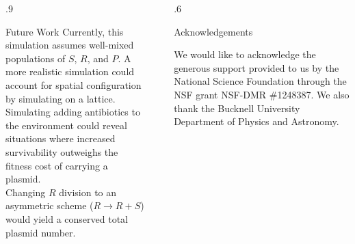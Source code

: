 \documentclass[final]{beamer}
\newlength{\sepwid}
\newlength{\onecolwid}
\begin{document}
\begin{frame}[t]
\begin{block}
\begin{columns}[t]
\begin{column}{.9\onecolwid}
  \begin{alertblock}{Future Work}
    Currently, this simulation assumes well-mixed populations of $S$, $R$, and $P$.
    A more realistic simulation could account for spatial configuration by simulating on a lattice.\\
    \quad\quad Simulating adding antibiotics to the environment could reveal situations
    where increased survivability outweighs the fitness cost of carrying a plasmid. \\
    \quad Changing $R$ division to an asymmetric scheme ($R \rightarrow R + S$) would
    yield a conserved total plasmid number.

    \vspace{.05ex}
  \end{alertblock}
\end{column}

\begin{column}{\sepwid}\end{column} %

\begin{column}{.6\onecolwid}
  \begin{alertblock}{Acknowledgements}

      We would like to acknowledge the generous support provided to us by the National Science
      Foundation through the NSF grant NSF-DMR \#1248387. We also thank the
      Bucknell University Department of Physics and Astronomy.
  \end{alertblock}
\end{column}
\end{columns} %
\end{block}
\vspace{1ex}


\end{frame} %
\end{document}
